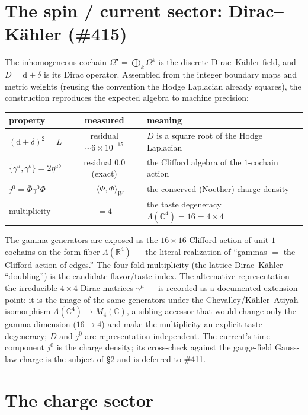 \documentclass[11pt]{article}
\newcommand{\C}{\mathbb{C}}
\newcommand{\R}{\mathbb{R}}
\newcommand{\dd}{\mathrm{d}}
\begin{document}
\section{The spin / current sector: Dirac--K\"ahler (\#415)}
\label{sec:dk}
The inhomogeneous cochain $\Omega^\bullet=\bigoplus_k\Omega^k$ is the discrete
Dirac--K\"ahler field, and $D=\dd+\delta$ is its Dirac operator. Assembled from the
integer boundary maps and metric weights (reusing the convention the Hodge Laplacian
already squares), the construction reproduces the expected algebra to machine precision:

\begin{center}
\small
\begin{tabular}{@{}lcl@{}}
\toprule
property & measured & meaning\\
\midrule
$(\dd+\delta)^2 = L$ & residual $\sim 6\times10^{-15}$ & $D$ is a square root of the Hodge Laplacian\\
$\{\gamma^a,\gamma^b\}=2\eta^{ab}$ & residual $0.0$ (exact) & the Clifford algebra of the $1$-cochain action\\
$j^0=\bar\Phi\gamma^0\Phi$ & $=\langle\Phi,\Phi\rangle_W$ & the conserved (Noether) charge density\\
multiplicity & $=4$ & the taste degeneracy $\Lambda(\C^4)=16=4\times4$\\
\bottomrule
\end{tabular}
\end{center}

\noindent The gamma generators are exposed as the $16\times16$ Clifford action of unit
$1$-cochains on the form fiber $\Lambda(\R^4)$ --- the literal realization of ``gammas
$=$ the Clifford action of edges.'' The four-fold multiplicity (the lattice
Dirac--K\"ahler ``doubling'') is the candidate flavor/taste index. The alternative
representation --- the irreducible $4\times4$ Dirac matrices $\gamma^\mu$ --- is recorded
as a documented extension point: it is the image of the same generators under the
Chevalley/K\"ahler--Atiyah isomorphism $\Lambda(\C^4)\to M_4(\C)$, a sibling accessor that
would change only the gamma dimension ($16\to4$) and make the multiplicity an explicit
taste degeneracy; $D$ and $j^0$ are representation-independent. The current's time
component $j^0$ is the charge density; its cross-check against the gauge-field Gauss-law
charge is the subject of \S\ref{sec:charge} and is deferred to \#411.

\section{The charge sector}
\label{sec:charge}
\end{document}
